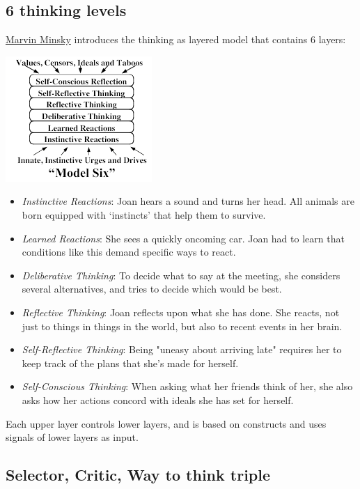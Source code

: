 \documentclass{acm_proc_article-sp}
\begin{document}
\subsection{6 thinking levels}

\href{http://web.media.mit.edu/~minsky/E5/eb5.html}{Marvin Minsky} introduces the thinking as layered model that contains 6 layers:

\includegraphics{model_6.png}

\begin{itemize}
 \item \emph{Instinctive Reactions}:  Joan hears a sound and turns her head. All animals are born equipped with ‘instincts’ that help them to survive.
 \item \emph{Learned Reactions}: She sees a quickly oncoming car. Joan had to learn that conditions like this demand specific ways to react.
 \item \emph{Deliberative Thinking}: To decide what to say at the meeting, she considers several alternatives, and tries to decide which would be best.
 \item \emph{Reflective Thinking}: Joan reflects upon what she has done. She reacts, not just to things in things in the world, but also to recent events in her brain.
 \item \emph{Self-Reflective Thinking}: Being "uneasy about arriving late" requires her to keep track of the plans that she's made for herself.
 \item \emph{Self-Conscious Thinking}: When asking what her friends think of her, she also asks how her actions concord with ideals she has set for herself.
\end{itemize}

Each upper layer controls lower layers, and is based on constructs and uses signals of lower layers as input.

\subsection{Selector, Critic, Way to think triple}
\end{document}
